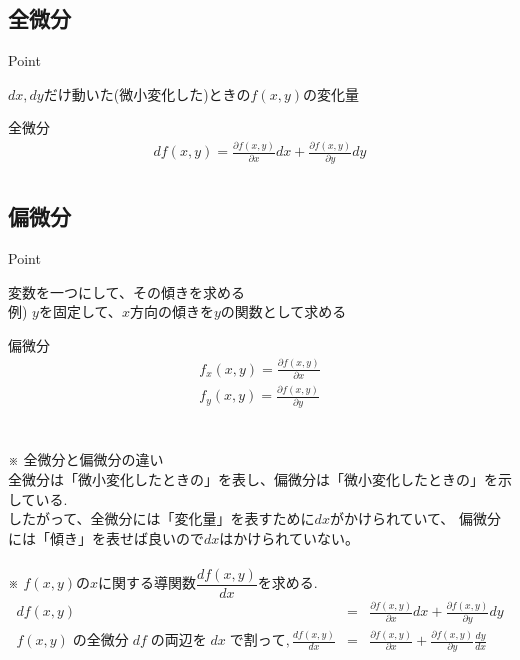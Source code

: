 \documentclass[a4paper]{jsarticle}
\begin{document}
\subsection{全微分}
\begin{itembox}[l]{Point}
    \begin{center}
        $dx,dy$だけ動いた(微小変化した)ときの$f\left(x,y\right)$の変化量
    \end{center}
\end{itembox}
\begin{itembox}[l]{全微分}
    \begin{eqnarray*}
        df\left(x,y\right)=\frac{\partial f\left(x,y\right)}{\partial x}dx+ \frac{\partial f\left(x,y\right)}{\partial y}dy\\
    \end{eqnarray*}
\end{itembox}
\subsection{偏微分}
\begin{itembox}[l]{Point}
    \begin{center}
        変数を一つにして、その傾きを求める\\
        例) $y$を固定して、$x$方向の傾きを$y$の関数として求める
    \end{center}
\end{itembox}
\begin{itembox}[l]{偏微分}
    \begin{eqnarray*}
        f_x\left(x,y\right)=\frac{\partial f\left(x,y\right)}{\partial x}\\
        f_y\left(x,y\right)=\frac{\partial f\left(x,y\right)}{\partial y}\\
    \end{eqnarray*}
\end{itembox}
\\
※ 全微分と偏微分の違い\\
全微分は「微小変化したときの」を表し、偏微分は「微小変化したときの」を示している.\\
したがって、全微分には「変化量」を表すために$dx$がかけられていて、
偏微分には「傾き」を表せば良いので$dx$はかけられていない。
\\ \\
※ $f\left(x,y\right)$の$x$に関する導関数$\dfrac{df\left(x,y\right)}{dx}$を求める.\\
\begin{eqnarray*}
    df\left(x,y\right)&=&\frac{\partial f\left(x,y\right)}{\partial x}dx+ \frac{\partial f\left(x,y\right)}{\partial y}dy\\
    f\left(x,y\right)\; の全微分\; df \; の両辺を\; dx\; で割って,
    \frac{d f\left(x,y\right)}{dx}&=&\frac{\partial f\left(x,y\right)}{\partial x}+ \frac{\partial f\left(x,y\right)}{\partial y}\frac{dy}{dx}\\
\end{eqnarray*}
\end{document}
